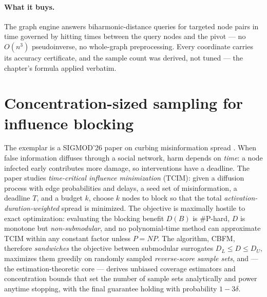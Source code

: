 \paragraph{What it buys.}
The graph engine answers biharmonic-distance queries for targeted node pairs in time governed
by hitting times between the query nodes and the pivot --- no $O(n^3)$ pseudoinverse, no
whole-graph preprocessing. Every coordinate carries its accuracy certificate, and the sample
count was derived, not tuned --- the chapter's formula applied verbatim.

\section{Concentration-sized sampling for influence blocking}
\label{sec:est-tcim}

The exemplar is a SIGMOD'26 paper on curbing misinformation spread \citep{sigmod26-373}. When
false information diffuses through a social network, harm depends on \emph{time}: a node
infected early contributes more damage, so interventions have a deadline. The paper studies
\emph{time-critical influence minimization} (TCIM): given a diffusion process with edge
probabilities and delays, a seed set of misinformation, a deadline $T$, and a budget $k$, choose
$k$ nodes to block so that the total \emph{activation-duration-weighted} spread is minimized.
The objective is maximally hostile to exact optimization: evaluating the blocking benefit
$D(B)$ is \#P-hard, $D$ is monotone but \emph{non-submodular}, and no polynomial-time method
can approximate TCIM within any constant factor unless $P = NP$. The algorithm, CBFM,
therefore \emph{sandwiches} the objective between submodular surrogates $D_L \le D \le D_U$,
maximizes them greedily on randomly sampled \emph{reverse-score sample sets}, and --- the
estimation-theoretic core --- derives unbiased coverage estimators and concentration bounds
that set the number of sample sets analytically and power anytime stopping, with the final
guarantee holding with probability $1-3\delta$.

